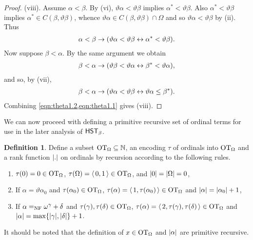 \documentclass[UKenglish,cleveref,DIV=12]{scrartcl}
\theoremstyle{definition}
\newtheorem{definition}[lemma]{Definition}
\theoremstyle{definition}
\begin{document}
\begin{proof}
(viii). Assume $\alpha<\beta$. By (vi), $\vartheta\alpha<\vartheta\beta$ implies $\alpha^*<\vartheta\beta$. Also $\alpha^*<\vartheta\beta$ implies $\alpha^*\in C(\beta,\vartheta\beta)$, whence $\vartheta\alpha\in C(\beta,\vartheta\beta)\cap \Omega$ and so $\vartheta\alpha<\vartheta\beta$ by (ii). Thus
\begin{align}\label{eqn:theta1.1}
 \alpha<\beta\rightarrow(\vartheta\alpha<\vartheta\beta \leftrightarrow \alpha^*<\vartheta\beta).
\end{align}
Now suppose $\beta<\alpha$. By the same argument we obtain
\begin{align*}
 \beta<\alpha \rightarrow(\vartheta\beta<\vartheta\alpha \leftrightarrow \beta^*<\vartheta\alpha),
\end{align*}
and so, by (vii),
\begin{align}\label{eqn:theta1.2}
 \beta<\alpha \rightarrow(\vartheta\alpha<\vartheta\beta \leftrightarrow \vartheta\alpha\le\beta^*).
\end{align}
Combining \eqref{eqn:theta1.2,eqn:theta1.1} gives (viii).
%
\end{proof}
We can now proceed with defining a primitive recursive set of ordinal terms for
use in the later analysis of $\mathsf{HST}_\beta$.
\begin{definition} Define a subset $\mathrm{OT}_\Omega\subseteq\mathbb N$, an encoding $\tau$
of ordinals into $\mathrm{OT}_\Omega$ and a rank function $\lvert{.}\rvert$ on ordinals by
recursion according to the following rules.
\begin{enumerate}%
 \item $\tau(0)=0\in\mathrm{OT}_\Omega$, $\tau(\Omega)=\langle\,0,1\,\rangle\in\mathrm{OT}_\Omega$, and $\lvert{0}\rvert=\lvert{\Omega}\rvert=0$,
 \item If $\alpha=\vartheta\alpha_0$ and $\tau(\alpha_0)\in\mathrm{OT}_\Omega$, $\tau(\alpha)=\langle\,1,\tau(\alpha_0)\,\rangle\in\mathrm{OT}_\Omega$ and $\lvert{\alpha}\rvert=\lvert{\alpha_0}\rvert+1$,
 \item If $\alpha=_{\mathrm{NF}}\omega^\gamma+\delta$ and $\tau(\gamma),\tau(\delta)\in\mathrm{OT}_\Omega$, $\tau(\alpha)=\langle\,2,\tau(\gamma),\tau(\delta)\,\rangle\in\mathrm{OT}_\Omega$ and $\lvert{\alpha}\rvert=\max\{\lvert{\gamma}\rvert,\lvert{\delta}\rvert\}+1$.
\end{enumerate}
\end{definition}
It should be noted that the definition of $x\in\mathrm{OT}_\Omega$ and $\lvert{\alpha}\rvert$ are primitive recursive.
\end{document}
